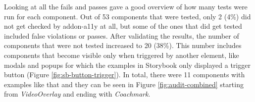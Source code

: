 \documentclass{master_thesis}
\begin{document}


Looking at all the fails and passes gave a good overview of how many tests were run for each component. Out of 53 components that were tested, only 2 (4\%) did not get checked by addon-a11y at all, but some of the ones that did get tested included false violations or passes. After validating the results, the number of components that were not tested increased to 20 (38\%). This number includes components that become visible only when triggered by another element, like modals and popups for which the examples in Storybook only displayed a trigger button (Figure \ref{fig:sb-button-trigger}). In total, there were 11 components with examples like that and they can be seen in Figure \ref{fig:audit-combined} starting from \textit{VideoOverlay} and ending with \textit{Coachmark}.
\end{document}
